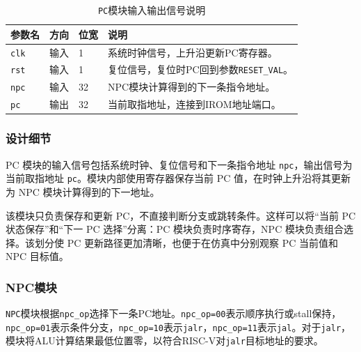 \documentclass[12pt,a4paper]{ctexart}
\newcommand{\code}[1]{\texttt{#1}}
\begin{document}
\begin{table}[H]
	\centering
	\caption{\code{PC}模块输入输出信号说明}
	\footnotesize
	\renewcommand{\arraystretch}{1.15}
	\begin{tabularx}{\textwidth}{p{3.2cm}p{1.5cm}p{2.1cm}X}
		\toprule
		参数名        & 方向 & 位宽 & 说明                               \\
		\midrule
		\code{clk} & 输入 & 1  & 系统时钟信号，上升沿更新PC寄存器。               \\
		\code{rst} & 输入 & 1  & 复位信号，复位时PC回到参数\code{RESET\_VAL}。 \\
		\code{npc} & 输入 & 32 & NPC模块计算得到的下一条指令地址。               \\
		\code{pc}  & 输出 & 32 & 当前取指地址，连接到IROM地址端口。              \\
		\bottomrule
	\end{tabularx}
\end{table}

\subsubsection*{设计细节}

PC 模块的输入信号包括系统时钟、复位信号和下一条指令地址 \code{npc}，输出信号为当前取指地址 \code{pc}。模块内部使用寄存器保存当前 PC 值，在时钟上升沿将其更新为 NPC 模块计算得到的下一地址。

该模块只负责保存和更新 PC，不直接判断分支或跳转条件。这样可以将“当前 PC 状态保存”和“下一 PC 选择”分离：PC 模块负责时序寄存，NPC 模块负责组合选择。该划分使 PC 更新路径更加清晰，也便于在仿真中分别观察 PC 当前值和 NPC 目标值。

\subsubsection{NPC模块}

\code{NPC}模块根据\code{npc\_op}选择下一条PC地址。\code{npc\_op=00}表示顺序执行或stall保持，\code{npc\_op=01}表示条件分支，\code{npc\_op=10}表示\code{jalr}，\code{npc\_op=11}表示\code{jal}。对于\code{jalr}，模块将ALU计算结果最低位置零，以符合RISC-V对\code{jalr}目标地址的要求。
\end{document}
